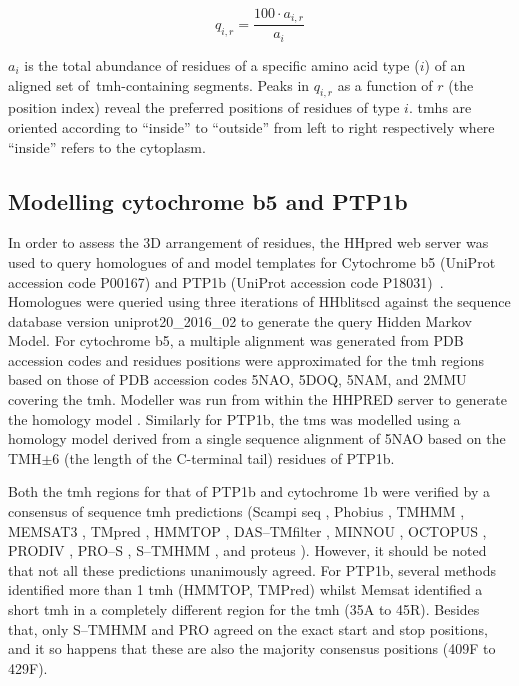\begin{equation} \label{eq:independent_normalisation2}
        q_{i,r}=\frac{{100}\cdot{a_{i,r}}}{a_i}
\end{equation}

$a_i$ is the total abundance of residues of a specific amino acid type ($i$) of an aligned set of~\gls{tmh}-containing segments.
Peaks in $q_{i,r}$ as a function of $r$ (the position index) reveal the preferred positions of residues of type $i$.
\gls{tmh}s are oriented according to ``inside'' to ``outside'' from left to right respectively where ``inside'' refers to the cytoplasm.

\subsection{Modelling cytochrome b5 and PTP1b}
In order to assess the 3D arrangement of residues, the HHpred web server was used to query homologues of and model templates for Cytochrome b5 (UniProt accession code P00167) and PTP1b (UniProt accession code P18031)~\cite{Soding2005}.
Homologues were queried using three iterations of HHblitscd against the sequence database version uniprot20\_2016\_02 to generate the query Hidden Markov Model.
For cytochrome b5, a multiple alignment was generated from PDB accession codes and residues positions were approximated for the \gls{tmh} regions based on those of PDB accession codes 5NAO, 5DOQ, 5NAM, and 2MMU covering the \gls{tmh}.
Modeller was run from within the HHPRED server to generate the homology model \cite{Eswar2007, Webb2016}.
Similarly for PTP1b, the \gls{tms} was modelled using a homology model derived from a single sequence alignment of 5NAO based on the TMH$\pm$6 (the length of the C\--terminal tail) residues of PTP1b.

Both the \gls{tmh} regions for that of PTP1b and cytochrome 1b were verified by a consensus of sequence \gls{tmh} predictions (Scampi seq \cite{Bernsel2008}, Phobius \cite{Kall2004}, TMHMM \cite{Krogh2001}, MEMSAT3 \cite{Jones2007}, TMpred \cite{Hofmann1993}, HMMTOP \cite{Tusnady2001},
DAS--TMfilter \cite{Cserzo2004}, MINNOU \cite{Cao2006}, OCTOPUS \cite{Viklund2008}, PRODIV \cite{Viklund2004}, PRO--S \cite{Viklund2004}, S--TMHMM \cite{Viklund2004}, and proteus \cite{Montgomerie2008}).
However, it should be noted that not all these predictions unanimously agreed.
For PTP1b, several methods identified more than 1 \gls{tmh} (HMMTOP, TMPred) whilst Memsat identified a short \gls{tmh} in a completely different region for the \gls{tmh} (35A to 45R).
Besides that, only S--TMHMM and PRO agreed on the exact start and stop positions, and it so happens that these are also the majority consensus positions \cite{Kurowski2003} (409F to 429F).



